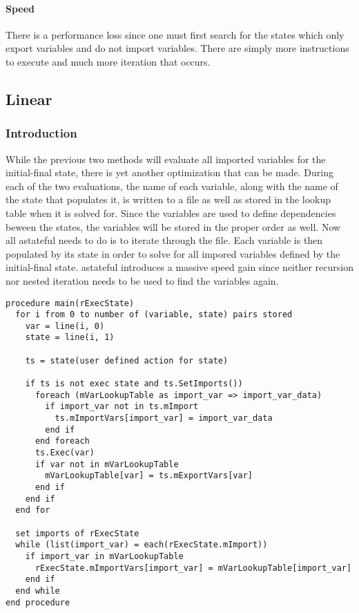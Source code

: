 \documentclass[11pt,twocolumn]{article}
\begin{document}
\paragraph{Speed}
There is a performance loss since one must first search for the states which only export variables and do not import variables. There are simply more instructions to execute and much more iteration that occurs.

\subsection{Linear}
\subsubsection{Introduction}
While the previous two methods will evaluate all imported variables for the initial-final state, there is yet another optimization that can be made. During each of the two evaluations, the name of each variable, along with the name of the state that populates it, is written to a file as well as stored in the lookup table when it is solved for. Since the variables are used to define dependencies beween the states, the variables will be stored in the proper order as well. Now all astateful needs to do is to iterate through the file. Each variable is then populated by its state in order to solve for all impored variables defined by the initial-final state. astateful introduces a massive speed gain since neither recursion nor nested iteration needs to be used to find the variables again.

\begin{small}
\begin{verbatim}
procedure main(rExecState)
  for i from 0 to number of (variable, state) pairs stored
    var = line(i, 0)
    state = line(i, 1)

    ts = state(user defined action for state)

    if ts is not exec state and ts.SetImports())
      foreach (mVarLookupTable as import_var => import_var_data)
        if import_var not in ts.mImport
          ts.mImportVars[import_var] = import_var_data
        end if
      end foreach
      ts.Exec(var)
      if var not in mVarLookupTable
        mVarLookupTable[var] = ts.mExportVars[var]
      end if
    end if
  end for

  set imports of rExecState
  while (list(import_var) = each(rExecState.mImport))
    if import_var in mVarLookupTable
      rExecState.mImportVars[import_var] = mVarLookupTable[import_var]
    end if
  end while
end procedure
\end{verbatim}
\end{small}
\end{document}
